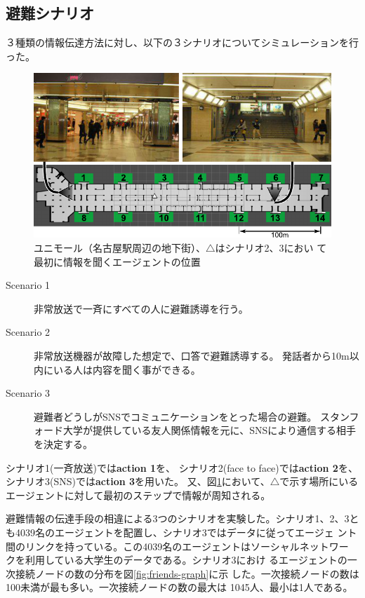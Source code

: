 \documentclass[a4j]{jarticle}
\begin{document}
\subsection{避難シナリオ}
３種類の情報伝達方法に対し、以下の３シナリオについてシミュレーションを行った。
\begin{figure}[h]
  \centering
  \includegraphics[width=\linewidth]{fig/unimall.pdf}
  \caption{ユニモール（名古屋駅周辺の地下街）、$\triangle$はシナリオ2、3におい
 て最初に情報を聞くエージェントの位置}
  \label{fig:unimall}
\end{figure}

\begin{description}
\item[Scenario 1]{%
  非常放送で一斉にすべての人に避難誘導を行う。
}
\item[Scenario 2]{%
  非常放送機器が故障した想定で、口答で避難誘導する。
  発話者から10m以内にいる人は内容を聞く事ができる。
}
\item[Scenario 3]{%
  避難者どうしがSNSでコミュニケーションをとった場合の避難。
  スタンフォード大学が提供している友人関係情報を元に、SNSにより通信する相手を決定する。
}
\end{description}


シナリオ1(一斉放送)では{\bfseries action 1}を、
シナリオ2(face to face)では{\bfseries action 2}を、
シナリオ3(SNS)では{\bfseries action 3}を用いた。
又、図\ref{fig:unimall}において、$\triangle$で示す場所にいるエージェントに対して最初のステップで情報が周知される。

避難情報の伝達手段の相違による3つのシナリオを実験した。シナリオ1、2、3と
も4039名のエージェントを配置し、シナリオ3ではデータに従ってエージェ
ント間のリンクを持っている。この4039名のエージェントはソーシャルネットワー
クを利用している大学生のデータである\cite{stanford-sns}。シナリオ3におけ
るエージェントの一次接続ノードの数の分布を図\ref{fig:friends-graph}に示
した。一次接続ノードの数は100未満が最も多い。一次接続ノードの数の最大は
1045人、最小は1人である。
\end{document}
